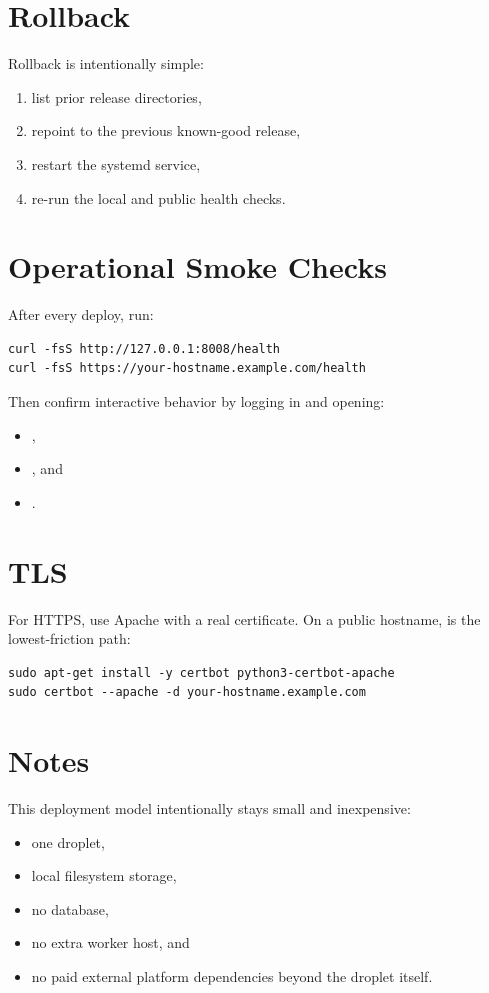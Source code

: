 \documentclass[11pt]{article}
\begin{document}
\section{Rollback}
Rollback is intentionally simple:
\begin{enumerate}[leftmargin=1.5em]
    \item list prior release directories,
    \item repoint  to the previous known-good release,
    \item restart the systemd service,
    \item re-run the local and public health checks.
\end{enumerate}

\section{Operational Smoke Checks}
After every deploy, run:
\begin{lstlisting}
curl -fsS http://127.0.0.1:8008/health
curl -fsS https://your-hostname.example.com/health
\end{lstlisting}
Then confirm interactive behavior by logging in and opening:
\begin{itemize}[leftmargin=1.5em]
    \item {},
    \item {}, and
    \item {}.
\end{itemize}

\section{TLS}
For HTTPS, use Apache with a real certificate. On a public hostname,  is the lowest-friction path:
\begin{lstlisting}
sudo apt-get install -y certbot python3-certbot-apache
sudo certbot --apache -d your-hostname.example.com
\end{lstlisting}

\section{Notes}
This deployment model intentionally stays small and inexpensive:
\begin{itemize}[leftmargin=1.5em]
    \item one droplet,
    \item local filesystem storage,
    \item no database,
    \item no extra worker host, and
    \item no paid external platform dependencies beyond the droplet itself.
\end{itemize}
\end{document}
